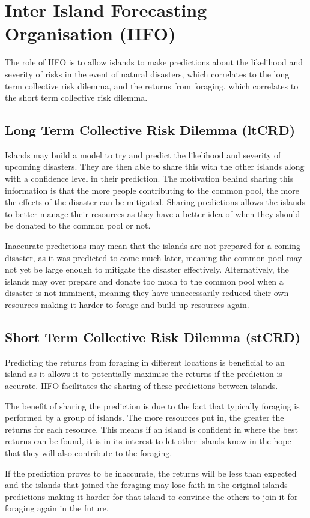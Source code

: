 \chapter{Inter Island Forecasting Organisation (IIFO)}

The role of IIFO is to allow islands to make predictions about the likelihood and severity of risks in the event of natural disasters, which correlates to the long term collective risk dilemma, and the returns from foraging, which correlates to the short term collective risk dilemma.

\section{Long Term Collective Risk Dilemma (ltCRD)}
\label{sec:IIFO:ltCRD}

Islands may build a model to try and predict the likelihood and severity of upcoming disasters. They are then able to share this with the other islands along with a confidence level in their prediction. The motivation behind sharing this information is that the more people contributing to the common pool, the more the effects of the disaster can be mitigated. Sharing predictions allows the islands to better manage their resources as they have a better idea of when they should be donated to the common pool or not.

Inaccurate predictions may mean that the islands are not prepared for a coming disaster, as it was predicted to come much later, meaning the common pool may not yet be large enough to mitigate the disaster effectively. Alternatively, the islands may over prepare and donate too much to the common pool when a disaster is not imminent, meaning they have unnecessarily reduced their own resources making it harder to forage and build up resources again.

\section{Short Term Collective Risk Dilemma (stCRD)}
\label{sec:IIFO:stCRD}

Predicting the returns from foraging in different locations is beneficial to an island as it allows it to potentially maximise the returns if the prediction is accurate. IIFO facilitates the sharing of these predictions between islands.

The benefit of sharing the prediction is due to the fact that typically foraging is performed by a group of islands. The more resources put in, the greater the returns for each resource. This means if an island is confident in where the best returns can be found, it is in its interest to let other islands know in the hope that they will also contribute to the foraging.

If the prediction proves to be inaccurate, the returns will be less than expected and the islands that joined the foraging may lose faith in the original islands predictions making it harder for that island to convince the others to join it for foraging again in the future.
